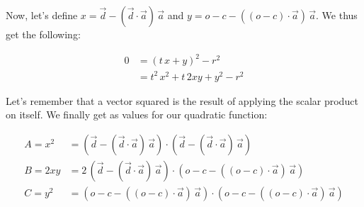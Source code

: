 \documentclass{article}
\begin{document}
    Now, let's define $x = \vec{d} - (\vec{d} \cdot \vec{a}) \, \vec{a}$ and $y = o - c - ((o - c) \cdot \vec{a}) \, \vec{a}$.
    We thus get the following:
    
    \begin{align*}
        0 &= \left(t \, x + y\right)^2 - r^2\\
        &= t^2 \, x^2 + t \, 2xy + y^2 - r^2
    \end{align*}
    
    Let's remember that a vector squared is the result of applying the scalar product on itself.
    We finally get as values for our quadratic function:
    
    \begin{align*}
        A = x^2 &= \left(\vec{d} - (\vec{d} \cdot \vec{a}) \, \vec{a}\right) \cdot \left(\vec{d} - (\vec{d} \cdot \vec{a}) \, \vec{a}\right)\\
        B = 2xy &= 2 \, \left(\vec{d} - (\vec{d} \cdot \vec{a}) \, \vec{a}\right) \cdot \left(o - c - ((o - c) \cdot \vec{a}) \, \vec{a}\right)\\
        C = y^2 &= \left(o - c - ((o - c) \cdot \vec{a}) \, \vec{a}\right) \cdot \left(o - c - ((o - c) \cdot \vec{a}) \, \vec{a}\right)
    \end{align*}
    
\end{document}
